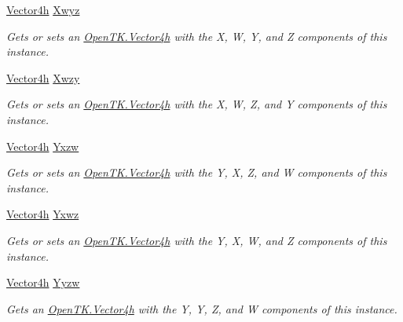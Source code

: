 \begin{DoxyCompactItemize}
\hyperlink{struct_open_t_k_1_1_vector4h}{Vector4h} \hyperlink{struct_open_t_k_1_1_vector4h_ab325e2a2b8f2cf1e1f7832aaf9afe842}{Xwyz}
\begin{DoxyCompactList}\small\item\em Gets or sets an \hyperlink{struct_open_t_k_1_1_vector4h}{Open\-T\-K.\-Vector4h} with the X, W, Y, and Z components of this instance. \end{DoxyCompactList}\item 
\hyperlink{struct_open_t_k_1_1_vector4h}{Vector4h} \hyperlink{struct_open_t_k_1_1_vector4h_acffa73fb0adabc9c6c60f418edd225f1}{Xwzy}
\begin{DoxyCompactList}\small\item\em Gets or sets an \hyperlink{struct_open_t_k_1_1_vector4h}{Open\-T\-K.\-Vector4h} with the X, W, Z, and Y components of this instance. \end{DoxyCompactList}\item 
\hyperlink{struct_open_t_k_1_1_vector4h}{Vector4h} \hyperlink{struct_open_t_k_1_1_vector4h_ad39dbbe238a08e80ad905dee0efdacad}{Yxzw}
\begin{DoxyCompactList}\small\item\em Gets or sets an \hyperlink{struct_open_t_k_1_1_vector4h}{Open\-T\-K.\-Vector4h} with the Y, X, Z, and W components of this instance. \end{DoxyCompactList}\item 
\hyperlink{struct_open_t_k_1_1_vector4h}{Vector4h} \hyperlink{struct_open_t_k_1_1_vector4h_a00eee3f6d6254b784f054b25a43fbed5}{Yxwz}
\begin{DoxyCompactList}\small\item\em Gets or sets an \hyperlink{struct_open_t_k_1_1_vector4h}{Open\-T\-K.\-Vector4h} with the Y, X, W, and Z components of this instance. \end{DoxyCompactList}\item 
\hyperlink{struct_open_t_k_1_1_vector4h}{Vector4h} \hyperlink{struct_open_t_k_1_1_vector4h_a729e5aae17bcbe9d07018ae47e61f1fb}{Yyzw}
\begin{DoxyCompactList}\small\item\em Gets an \hyperlink{struct_open_t_k_1_1_vector4h}{Open\-T\-K.\-Vector4h} with the Y, Y, Z, and W components of this instance. \end{DoxyCompactList}\item 

\end{DoxyCompactItemize}
